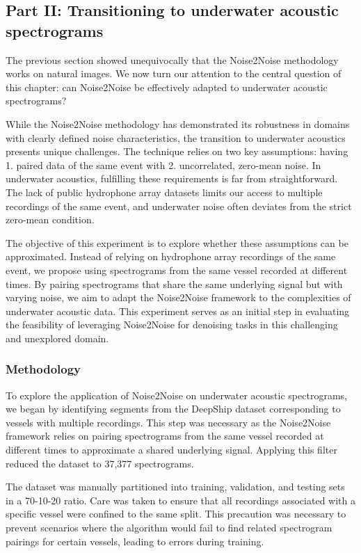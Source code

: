 \subsection{Part II: Transitioning to underwater acoustic spectrograms}

The previous section showed unequivocally that the Noise2Noise methodology works on natural images. We now turn our attention to the central question of this chapter: can Noise2Noise be effectively adapted to underwater acoustic spectrograms? 

While the Noise2Noise methodology has demonstrated its robustness in domains with clearly defined noise characteristics, the transition to underwater acoustics presents unique challenges. The technique relies on two key assumptions: having 1. paired data of the same event with 2. uncorrelated, zero-mean noise. In underwater acoustics, fulfilling these requirements is far from straightforward. The lack of public hydrophone array datasets limits our access to multiple recordings of the same event, and underwater noise often deviates from the strict zero-mean condition. 

The objective of this experiment is to explore whether these assumptions can be approximated. Instead of relying on hydrophone array recordings of the same event, we propose using spectrograms from the same vessel recorded at different times. By pairing spectrograms that share the same underlying signal but with varying noise, we aim to adapt the Noise2Noise framework to the complexities of underwater acoustic data. This experiment serves as an initial step in evaluating the feasibility of leveraging Noise2Noise for denoising tasks in this challenging and unexplored domain.

\subsubsection{Methodology}

To explore the application of Noise2Noise on underwater acoustic spectrograms, we began by identifying segments from the DeepShip dataset corresponding to vessels with multiple recordings. This step was necessary as the Noise2Noise framework relies on pairing spectrograms from the same vessel recorded at different times to approximate a shared underlying signal. Applying this filter reduced the dataset to 37,377 spectrograms.

The dataset was manually partitioned into training, validation, and testing sets in a 70-10-20 ratio. Care was taken to ensure that all recordings associated with a specific vessel were confined to the same split. This precaution was necessary to prevent scenarios where the algorithm would fail to find related spectrogram pairings for certain vessels, leading to errors during training.

